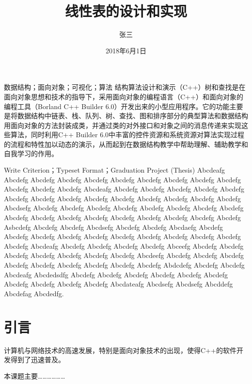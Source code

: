 \documentclass[supercite]{upcthesis}
\title{线性表的设计和实现}
\author{张三}
\date{2018年6月1日}
\begin{document}
	\maketitle
	\begin{cnabstract}{数据结构；面向对象；可视化；算法}
		结构算法设计和演示（C++）树和查找是在面向对象思想和技术的指导下，采用面向对象的编程语言（C++）和面向对象的编程工具（Borland C++ Builder 6.0）开发出来的小型应用程序。它的功能主要是将数据结构中链表、栈、队列、树、查找、图和排序部分的典型算法和数据结构用面向对象的方法封装成类，并通过类的对外接口和对象之间的消息传递来实现这些算法，同时利用C++ Builder 6.0中丰富的控件资源和系统资源对算法实现过程的流程和特性加以动态的演示，从而起到在数据结构教学中帮助理解、辅助教学和自我学习的作用。
	\end{cnabstract}
    
	\begin{enabstract}{Write Criterion；Typeset Format；Graduation Project (Thesis)}
	Abcdeafg Abcdefg Abcdefg Abcdefg Abcdefg Abcdefg Abcdefg Abcdefg Abcdefg Abcdefg Abcdefg Abcdefg Abcdefg Abcdeafg Abcdefg Abcdefg Abcdefg Abcdefg Abcdefg Abcdefg Abcdefg Abcdefg Abcdefg Abcdefg Abcdefg Abcdefg Abcdefg Abcdefg Abcdsefg Abcdefg Abcdefg Abcdefg Abcdefg Abcdefg Abcdefg Abcdefg Abcdefg Abcdefg Abcdefg Abcdefg Abcdefg Abcdefg Abcdefg Abcdefg Abcdefg Abcdefg Asbcdefg Abcdefg Abcdefg Abcdsefg Abcdefg Abcdefg Abcdaefg Abcdefg Abcdefg Abcdefg Abcdefg Abcdefg Abcdefg Abcdefg Abcdefg Abcdefg Abcdefg Abcdefg Abcdeafg Abcdefg Abcdefg Abcdefg Abcdefg Abceefg Abcdefg Abcdefg Abcdefg Abcdefg Abcdefg Abcdefg Abcdefg Abcdeefg Abcdefg Abcdefg Abcdefg Abcdefg Abcdefg Abcdefg Abcdefg Abcdefg Abcdefg Abdcdefg Abcdefg Abcdefg Abcdeafg Abcdedsdfg Abcdefg Abcdefg Abcdefg Abcdefg Abcdefg Abcdefg Abcdefg Abcdefg Abcdefg Abcdefg Abcdateafg Abcdsefg Abcdsefg Abcddefg Abcdefag Abcdedfg.
	\end{enabstract}

\tableofcontents


\section{引言}
计算机与网络技术的高速发展，特别是面向对象技术的出现，使得C++的软件开发得到了迅速普及。

本课题主要………………







\theorembodyfont{\songti}
\newtheorem{mdef}{\quad\quad 定义}[section]　%
\theorembodyfont{\songti}
\newtheorem{mthe}{\quad\quad 定理}[section]
\theorembodyfont{\songti}
\newtheorem*{mpro}{\quad\quad 证明} %
\theorembodyfont{\songti}
\newtheorem{mlma}{\quad\quad 引理}[section]
\theorembodyfont{\songti}
\newtheorem{mcor}{\quad\quad 推论}[section]
\theorembodyfont{\songti}
\newtheorem{mexa}{\quad\quad 例}[section]
\end{document}
